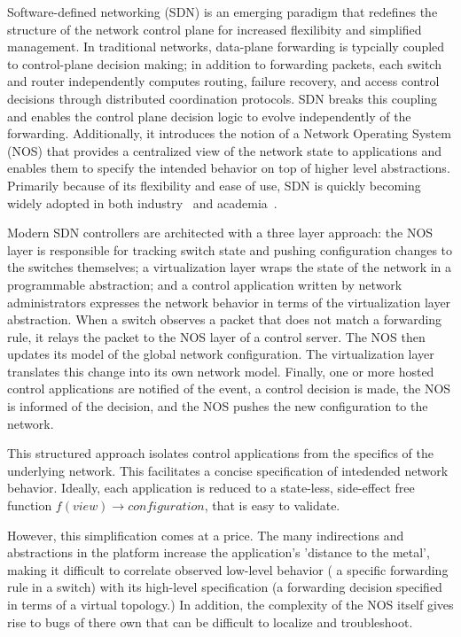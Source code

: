 Software-defined networking (SDN) is an emerging paradigm that redefines
the structure of the network control plane for increased flexilibity and
simplified management. In traditional networks, data-plane forwarding is
typcially coupled to control-plane decision making; in addition to forwarding
packets, each switch and router independently computes routing, failure
recovery, and access control decisions through distributed coordination protocols.
SDN breaks this coupling and enables the control plane decision logic to evolve
independently of the forwarding. Additionally, it introduces the notion of a
Network Operating System (NOS) that provides a centralized view of the network
state to applications and enables them to specify the intended behavior on top
of higher level abstractions. Primarily because of its flexibility and ease of use, SDN
is quickly becoming widely adopted in both industry~\cite{nicirahomepage,
bigswitch} and academia~\cite{nox, pox, ethane}.

Modern SDN controllers are architected with a three layer approach: the NOS
layer is responsible for tracking switch state and pushing configuration
changes to the switches themselves; a virtualization layer
wraps the state of the network in a programmable abstraction; and a control
application written by network administrators 
expresses the network behavior in terms of the virtualization layer abstraction.
When a switch observes a packet that does not match a forwarding rule, it relays the
packet to the NOS layer of a control server.
The NOS then updates its model of the global network configuration. The
virtualization layer translates this change into its own network model. 
Finally, one or more hosted control applications are notified of the event, a
control decision is made, the NOS is informed of the decision, and the NOS
pushes the new configuration to the network.

This structured approach isolates control applications from the specifics
of the underlying network. This facilitates a concise specification of
intedended network behavior. Ideally, each application is reduced to a
state-less, side-effect free function $f(view) \rightarrow configuration$, that is
easy to validate.

However, this simplification comes at a price. The 
many indirections and abstractions in the platform increase the application's 'distance to
the metal', making it difficult to correlate observed low-level behavior
(\eg{} a specific forwarding rule in a switch) with its high-level specification
(a forwarding decision specified in terms of a virtual topology.) In addition, the
complexity of the NOS itself gives rise to bugs of there own that can be
difficult to localize and troubleshoot. 

